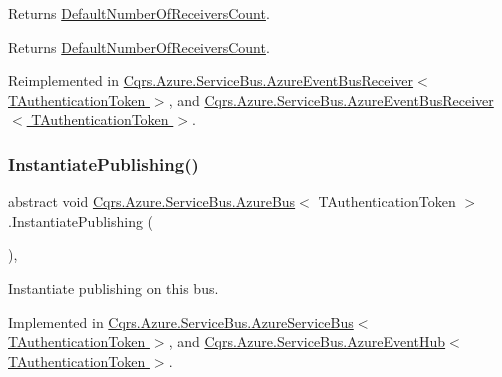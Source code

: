 Returns \hyperlink{classCqrs_1_1Azure_1_1ServiceBus_1_1AzureBus_a19642a14d6cf036cbbdb68b9ba7e635d_a19642a14d6cf036cbbdb68b9ba7e635d}{Default\+Number\+Of\+Receivers\+Count}. 

\begin{DoxyReturn}{Returns}
\hyperlink{classCqrs_1_1Azure_1_1ServiceBus_1_1AzureBus_a19642a14d6cf036cbbdb68b9ba7e635d_a19642a14d6cf036cbbdb68b9ba7e635d}{Default\+Number\+Of\+Receivers\+Count}.
\end{DoxyReturn}


Reimplemented in \hyperlink{classCqrs_1_1Azure_1_1ServiceBus_1_1AzureEventBusReceiver_a153e44d4d94a6d812e3990cc2a417eed_a153e44d4d94a6d812e3990cc2a417eed}{Cqrs.\+Azure.\+Service\+Bus.\+Azure\+Event\+Bus\+Receiver$<$ T\+Authentication\+Token $>$}, and \hyperlink{classCqrs_1_1Azure_1_1ServiceBus_1_1AzureEventBusReceiver_a153e44d4d94a6d812e3990cc2a417eed_a153e44d4d94a6d812e3990cc2a417eed}{Cqrs.\+Azure.\+Service\+Bus.\+Azure\+Event\+Bus\+Receiver$<$ T\+Authentication\+Token $>$}.

\mbox{\label{classCqrs_1_1Azure_1_1ServiceBus_1_1AzureBus_a0bacaa4619921333da4a27371c1d6d0a_a0bacaa4619921333da4a27371c1d6d0a}} 
\subsubsection{\texorpdfstring{Instantiate\+Publishing()}{InstantiatePublishing()}}
{\footnotesize\ttfamily abstract void \hyperlink{classCqrs_1_1Azure_1_1ServiceBus_1_1AzureBus}{Cqrs.\+Azure.\+Service\+Bus.\+Azure\+Bus}$<$ T\+Authentication\+Token $>$.Instantiate\+Publishing (\begin{DoxyParamCaption}{ }\end{DoxyParamCaption})\hspace{0.3cm}{\ttfamily [protected]}, {}}



Instantiate publishing on this bus. 



Implemented in \hyperlink{classCqrs_1_1Azure_1_1ServiceBus_1_1AzureServiceBus_a5c286d29b0bbfe3770f3407efda57036_a5c286d29b0bbfe3770f3407efda57036}{Cqrs.\+Azure.\+Service\+Bus.\+Azure\+Service\+Bus$<$ T\+Authentication\+Token $>$}, and \hyperlink{classCqrs_1_1Azure_1_1ServiceBus_1_1AzureEventHub_a3747fb9fcb3de2a72c8a6d7bbd92db95_a3747fb9fcb3de2a72c8a6d7bbd92db95}{Cqrs.\+Azure.\+Service\+Bus.\+Azure\+Event\+Hub$<$ T\+Authentication\+Token $>$}.

